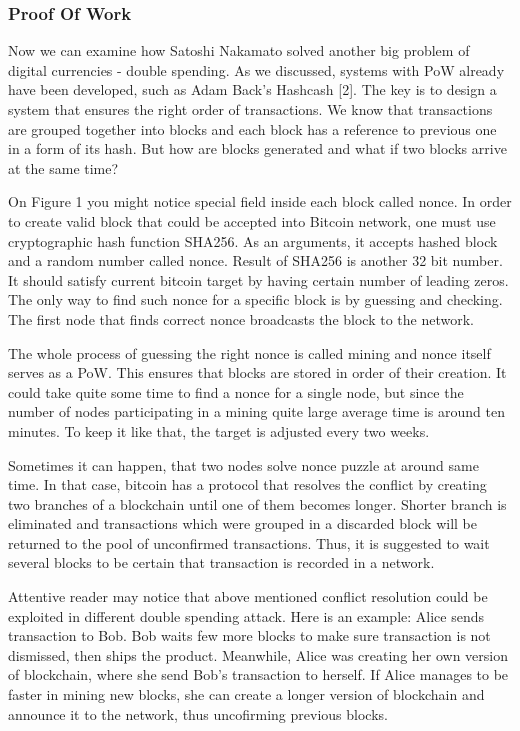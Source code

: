 \documentclass[conference,compsoc]{IEEEtran}
\begin{document}
\subsubsection{Proof Of Work}
Now we can examine how Satoshi Nakamato solved another big problem of digital currencies - double spending.
As we discussed, systems with PoW already have been developed, such as Adam Back's Hashcash [2]. 
The key is to design a system that ensures the right order of transactions. 
We know that transactions are grouped together into blocks and each block has a reference to previous one in a form of its hash. 
But how are blocks generated and what if two blocks arrive at the same time? 

On Figure 1 you might notice special field inside each block called nonce. 
In order to create valid block that could be accepted into Bitcoin network, one must use cryptographic hash function SHA256. 
As an arguments, it accepts hashed block and a random number called nonce.
Result of SHA256 is another 32 bit number. 
It should satisfy current bitcoin target by having certain number of leading zeros. 
The only way to find such nonce for a specific block is by guessing and checking. 
The first node that finds correct nonce broadcasts the block to the network. 

The whole process of guessing the right nonce is called mining and nonce itself serves as a PoW. 
This ensures that blocks are stored in order of their creation.
It could take quite some time to find a nonce for a single node, but since the number of nodes participating in a mining quite large average time is around ten minutes. 
To keep it like that, the target is adjusted every two weeks.

Sometimes it can happen, that two nodes solve nonce puzzle at around same time. 
In that case, bitcoin has a protocol that resolves the conflict by creating two branches of a blockchain until one of them becomes longer.
Shorter branch is eliminated and transactions which were grouped in a discarded block will be returned to the pool of unconfirmed transactions.
Thus, it is suggested to wait several blocks to be certain that transaction is recorded in a network.

Attentive reader may notice that above mentioned conflict resolution could be exploited in different double spending attack. 
Here is an example: Alice sends transaction to Bob. 
Bob waits few more blocks to make sure transaction is not dismissed, then ships the product.
Meanwhile, Alice was creating her own version of blockchain, where she send Bob's transaction to herself. 
If Alice manages to be faster in mining new blocks, she can create a longer version of blockchain and announce it to the network, thus uncofirming previous blocks.
\end{document}

